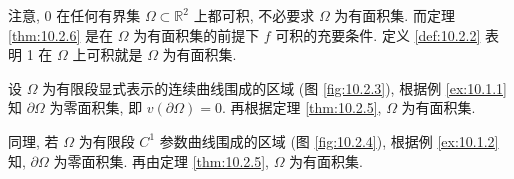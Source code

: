 注意, 0 在任何有界集 $\Omega \subset \mathbb{R}^2$ 上都可积, 不必要求 $\Omega$ 为有面积集. 而定理 \ref{thm:10.2.6} 是在 $\Omega$ 为有面积集的前提下 $f$ 可积的充要条件. 定义 \ref{def:10.2.2} 表明 1 在 $\Omega$ 上可积就是 $\Omega$ 为有面积集.

\begin{example}\label{ex:10.2.3}
设 $\Omega$ 为有限段显式表示的连续曲线围成的区域 (图 \ref{fig:10.2.3}), 根据例 \ref{ex:10.1.1} 知 $\partial\Omega$ 为零面积集, 即 $v(\partial\Omega)=0$. 再根据定理 \ref{thm:10.2.5}, $\Omega$ 为有面积集.

同理, 若 $\Omega$ 为有限段 $C^1$ 参数曲线围成的区域 (图 \ref{fig:10.2.4}), 根据例 \ref{ex:10.1.2} 知, $\partial\Omega$ 为零面积集. 再由定理 \ref{thm:10.2.5}, $\Omega$ 为有面积集.
\end{example}

